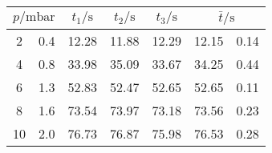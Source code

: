\label{tab:tabDL2}
	\begin{tabular}{S[table-format=2.0] @{${}\pm{}$} S[table-format=1.1]S[table-format=2.2]S[table-format=2.2]S[table-format=2.2]S[table-format=2.2] @{${}\pm{}$} S[table-format=1.2]}
		\toprule
		 & {$t_1/\si{\second}$} & {$t_2/\si{\second}$} & {$t_3/\si{\second}$} &  \\
		 & 0.4 & 12.28 & 11.88 & 12.29 & 12.15 & 0.14 \\
		 4 & 0.8 & 33.98 & 35.09 & 33.67 & 34.25 & 0.44 \\
		 6 & 1.3 & 52.83 & 52.47 & 52.65 & 52.65 & 0.11 \\
		 8 & 1.6 & 73.54 & 73.97 & 73.18 & 73.56 & 0.23 \\
		10 & 2.0 & 76.73 & 76.87 & 75.98 & 76.53 & 0.28 \\
		\bottomrule
	\end{tabular}
